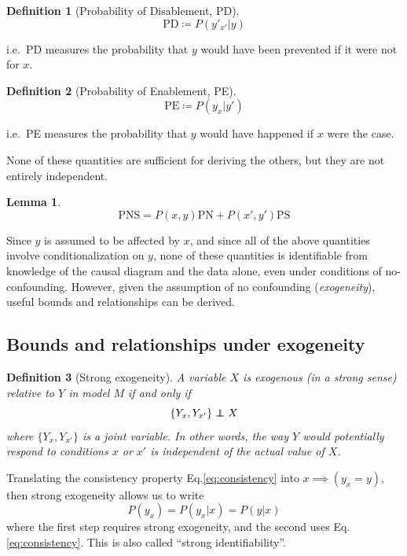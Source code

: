 \documentclass[11pt]{article}
\numberwithin{equation}{section}
\newcommand\indep{\protect\mathpalette{\protect\independenT}{\perp}}
\def\independenT#1#2{\mathrel{\rlap{$#1#2$}\mkern2mu{#1#2}}}
\newcommand{\defeq}{\coloneqq}
\newtheorem{defn}{Definition}[section]
\newtheorem{lma}{Lemma}[section]
\begin{document}
\begin{defn}[Probability of Disablement, PD]
\begin{equation}
\text{PD} \defeq P(y'_{x'}|y)
\end{equation}
\end{defn}
\noindent i.e.\ PD measures the probability that $y$ would have been prevented if it were not for $x$.

\begin{defn}[Probability of Enablement, PE]
\begin{equation}
\text{PE} \defeq P(y_x|y')
\end{equation}
\end{defn}
\noindent i.e.\ PE measures the probability that $y$ would have happened if $x$ were the case.

None of these quantities are sufficient for deriving the others, but they are not entirely independent.

\begin{lma}
\begin{equation}
\text{PNS} = P(x,y)\text{PN} + P(x',y')\text{PS}
\end{equation}
\end{lma}

Since $y$ is assumed to be affected by $x$, and since all of the above quantities involve conditionalization on $y$, none of these quantities is identifiable from knowledge of the causal diagram and the data alone, even under conditions of no-confounding. However, given the assumption of no confounding (\textit{exogeneity}), useful bounds and relationships can be derived.

\subsection{Bounds and relationships under exogeneity}

\begin{defn}[Strong exogeneity]
A variable $X$ is exogenous (in a strong sense) relative to $Y$ in model $M$ if and only if
\begin{equation}
\{Y_x, Y_{x'}\} \indep X
\end{equation}
where $\{Y_x, Y_{x'}\}$ is a joint variable. In other words, the way $Y$ would potentially respond to conditions $x$ or $x'$ is independent of the actual value of $X$.
\end{defn}

Translating the consistency property Eq.\eqref{eq:consistency} into $x \implies (y_x=y)$, then strong exogeneity allows us to write
\begin{equation}
P(y_x) = P(y_x|x) = P(y|x) \label{eq:strong-identifiability}
\end{equation}
where the first step requires strong exogeneity, and the second uses Eq.\eqref{eq:consistency}. This is also called ``strong identifiability''.
\end{document}

